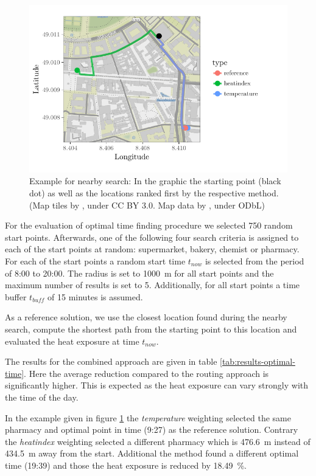 \begin{figure}
	\centering
	\includegraphics[scale=1]{figures/optimaltime_route_example}
	\caption{Example for nearby search: In the graphic the starting point (black dot) as well as the locations ranked first by the respective method. (Map tiles by \textcite{Stamen2017}, under CC BY 3.0. Map data by \textcite{OSMF2016}, under ODbL)}
	\label{fig:optimaltime-route-example}
\end{figure}

For the evaluation of optimal time finding procedure we selected 750 random start points. Afterwards, one of the following four search criteria is assigned to each of the start points at random: supermarket, bakery, chemist or pharmacy. For each of the start points a random start time $t_{now}$ is selected from the period of 8:00 to 20:00. The radius is set to \SI{1000}{\meter} for all start points and the maximum number of results is set to 5. Additionally, for all start points a time buffer $t_{buff}$ of 15 minutes is assumed. 

As a reference solution, we use the closest location found during the nearby search, compute the shortest path from the starting point to this location and evaluated the heat exposure at time $t_{now}$. 

The results for the combined approach are given in table \ref{tab:results-optimal-time}. Here the average reduction compared to the routing approach is significantly higher. This is expected as the heat exposure can vary strongly with the time of the day. 

In the example given in figure \ref{fig:optimaltime-route-example} the \emph{temperature} weighting selected the same pharmacy and optimal point in time (9:27) as the reference solution. Contrary the \emph{heatindex} weighting selected a different pharmacy which is \SI{476.6}{\meter} instead of  \SI{434.5}{\meter} away from the start. Additional the method found a different optimal time (19:39) and those the heat exposure is reduced by \SI{18.49}{\percent}.  
 
